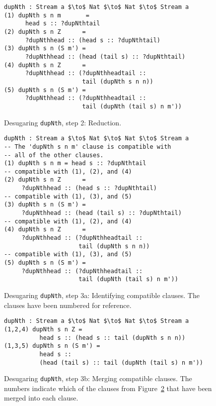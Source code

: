 \begin{figure}
\begin{lstlisting}[mathescape]
dupNth : Stream a $\to$ Nat $\to$ Nat $\to$ Stream a
(1) dupNth s n m       =
      head s :: ?dupNthtail
(2) dupNth s n Z      = 
      ?dupNthhead :: (head s :: ?dupNthtail)
(3) dupNth s n (S m') =
      ?dupNthhead :: (head (tail s) :: ?dupNthtail)
(4) dupNth s n Z      =
      ?dupNthhead :: (?dupNthheadtail :: 
                      tail (dupNth s n n))
(5) dupNth s n (S m') =
      ?dupNthhead :: (?dupNthheadtail :: 
                      tail (dupNth (tail s) n m'))
\end{lstlisting}
  \caption{Desugaring \texttt{dupNth}, step 2: Reduction.}
  \label{fig:desugared_dupNth_step2}
\end{figure}

\begin{figure}
\begin{lstlisting}[mathescape]
dupNth : Stream a $\to$ Nat $\to$ Nat $\to$ Stream a
-- The 'dupNth s n m' clause is compatible with 
-- all of the other clauses.
(1) dupNth s n m = head s :: ?dupNthtail
-- compatible with (1), (2), and (4)
(2) dupNth s n Z      = 
     ?dupNthhead :: (head s :: ?dupNthtail)
-- compatible with (1), (3), and (5)
(3) dupNth s n (S m') =
     ?dupNthhead :: (head (tail s) :: ?dupNthtail)
-- compatible with (1), (2), and (4)
(4) dupNth s n Z      =
     ?dupNthhead :: (?dupNthheadtail :: 
                     tail (dupNth s n n))
-- compatible with (1), (3), and (5)
(5) dupNth s n (S m') =
     ?dupNthhead :: (?dupNthheadtail :: 
                     tail (dupNth (tail s) n m'))
\end{lstlisting}
  \caption{Desugaring \texttt{dupNth}, step 3a: Identifying compatible
    clauses. The clauses have been numbered for reference.}
  \label{fig:desugared_dupNth_step3a}
\end{figure}

\begin{figure}
\begin{lstlisting}[mathescape]
dupNth : Stream a $\to$ Nat $\to$ Nat $\to$ Stream a
(1,2,4) dupNth s n Z = 
          head s :: (head s :: tail (dupNth s n n))
(1,3,5) dupNth s n (S m') = 
          head s :: 
          (head (tail s) :: tail (dupNth (tail s) n m'))
\end{lstlisting}
  \caption{Desugaring \texttt{dupNth}, step 3b: Merging compatible
    clauses. The numbers indicate which of the clauses from
    Figure~\ref{fig:desugared_dupNth_step3a} that have been merged into each clause.}
  \label{fig:desugared_dupNth_step3b}
\end{figure}

